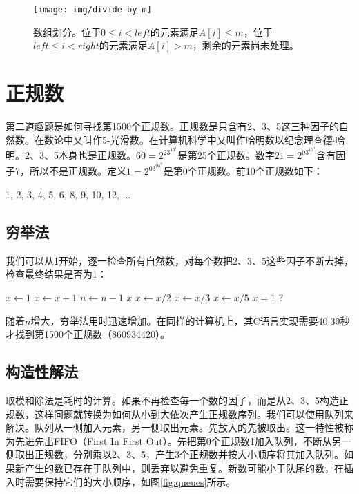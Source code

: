 \documentclass[b5paper]{ctexart}
\begin{document}
\begin{figure}[htbp]
  \centering
  \texttt{[image: img/divide-by-m]}
  \caption{数组划分。位于$0 \leq i < left$的元素满足$A[i] \leq m$，位于$left \leq i < right$的元素满足$A[i] > m$，剩余的元素尚未处理。}
  \label{fig:divide}
\end{figure}

\section*{正规数}

第二道趣题是如何寻找第1500个正规数。正规数是只含有2、3、5这三种因子的自然数。在数论中又叫作5-光滑数。在计算机科学中又叫作哈明数以纪念理查德$\cdot$哈明。2、3、5本身也是正规数。$60 = 2^23^15^1$是第25个正规数。数字$21 = 2^03^17^1$含有因子7，所以不是正规数。定义$1=2^03^05^0$是第0个正规数。前10个正规数如下：

1, 2, 3, 4, 5, 6, 8, 9, 10, 12, ...

\subsection*{穷举法}
我们可以从1开始，逐一检查所有自然数，对每个数把2、3、5这些因子不断去掉，检查最终结果是否为1：

\begin{algorithmic}[1]
  \State $x \gets 1$
    \State $x \gets x + 1$
      \State $n \gets n - 1$
    \EndIf
  \EndWhile
  \State \Return $x$
\EndFunction
\Statex
{}
    \State $x \gets x / 2$
  \EndWhile
    \State $x \gets x / 3$
  \EndWhile
    \State $x \gets x / 5$
  \EndWhile
  \State \Return $x = 1$ ?
\EndFunction
\end{algorithmic}

随着$n$增大，穷举法用时迅速增加。在同样的计算机上，其C语言实现需要40.39秒才找到第1500个正规数（860934420）。

\subsection*{构造性解法}
取模和除法是耗时的计算\cite{Bentley}。如果不再检查每一个数的因子，而是从2、3、5构造正规数，这样问题就转换为如何从小到大依次产生正规数序列。我们可以使用队列来解决。队列从一侧加入元素，另一侧取出元素。先放入的先被取出。这一特性被称为先进先出FIFO（First In First Out）。先把第0个正规数1加入队列，不断从另一侧取出正规数，分别乘以2、3、5，产生3个正规数并按大小顺序将其加入队列。如果新产生的数已存在于队列中，则丢弃以避免重复。新数可能小于队尾的数，在插入时需要保持它们的大小顺序，如图\ref{fig:queues}所示。
\end{document}
